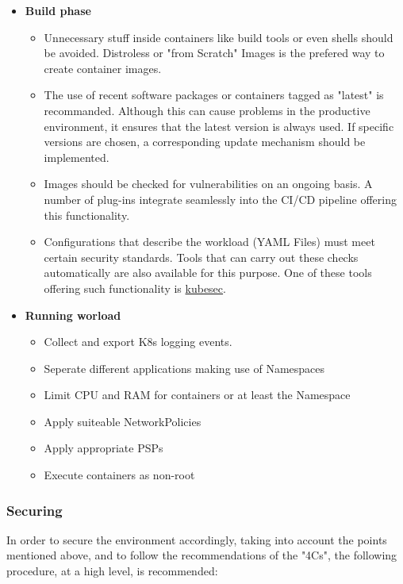 \documentclass[MSC,Master,english]{twbook}%
\begin{document}
\begin{itemize}
    \label{item:secureworkload}
    \item \textbf{Build phase}
    \begin{itemize}
        \item Unnecessary stuff inside containers like build tools or even shells should be avoided. Distroless or "from Scratch" Images is the prefered way to create container images.
        \item The use of recent software packages or containers tagged as "latest" is recommanded. Although this can cause problems in the productive environment, it ensures that the latest version is always used. If specific versions are chosen, a corresponding update mechanism should be implemented.
        \item Images should be checked for vulnerabilities on an ongoing basis. A number of plug-ins integrate seamlessly into the CI/CD pipeline offering this functionality.
        \item Configurations that describe the workload (YAML Files) must meet certain security standards. Tools that can carry out these checks automatically are also available for this purpose. One of these tools offering such functionality is \hyperref{https://kubesec.io/}{}{}{kubesec}\cite{kubesec}.
    \end{itemize}
    \item \textbf{Running worload}
    \begin{itemize}
        \item Collect and export \ac{K8s} logging events.
        \item Seperate different applications making use of Namespaces
        \item Limit \ac{CPU} and \ac{RAM} for containers or at least the Namespace
        \item Apply suiteable NetworkPolicies
        \item Apply appropriate \ac{PSP}s
        \item Execute containers as non-root
    \end{itemize}
\end{itemize}

\subsubsection{Securing}
In order to secure the environment accordingly, taking into account the points mentioned above, and to follow the recommendations of the "4Cs", the following procedure, at a high level, is recommended:
\end{document}
